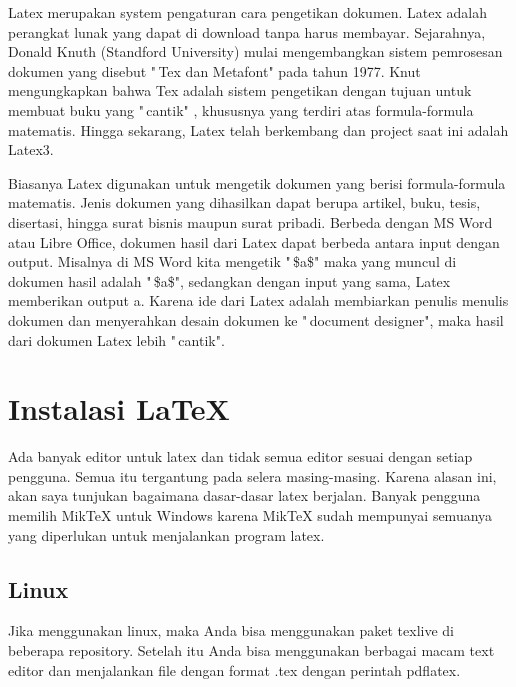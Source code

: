 \hspace{0,5in}Latex merupakan system pengaturan cara pengetikan dokumen. Latex adalah perangkat lunak yang dapat di download tanpa harus membayar. Sejarahnya, Donald Knuth (Standford University) mulai mengembangkan sistem pemrosesan dokumen yang disebut "\,Tex dan Metafont" pada tahun 1977. Knut mengungkapkan bahwa Tex adalah sistem pengetikan dengan tujuan 
untuk membuat buku yang "\,cantik" , khususnya yang terdiri atas formula-formula matematis. Hingga sekarang, Latex telah berkembang dan project saat ini adalah Latex3.\par \vspace{12pt}

\hspace{0,3in}Biasanya Latex digunakan untuk mengetik dokumen yang berisi formula-formula matematis. Jenis dokumen yang dihasilkan dapat berupa artikel, buku, tesis, disertasi, hingga surat bisnis maupun surat pribadi. Berbeda dengan MS Word atau Libre Office, dokumen hasil dari Latex dapat berbeda antara input dengan output. Misalnya di MS Word kita mengetik "\,\$a\$" maka yang muncul di dokumen hasil adalah "\,\$a\$", sedangkan dengan input yang sama, Latex memberikan output a. Karena ide dari Latex adalah membiarkan penulis menulis dokumen dan menyerahkan desain dokumen ke "\,document designer", maka hasil dari dokumen Latex lebih "\,cantik".\par \vspace{12pt}

\section{Instalasi LaTeX}\par \vspace{8pt}

Ada banyak editor untuk latex dan tidak semua editor sesuai dengan setiap pengguna. Semua itu tergantung pada selera masing-masing. Karena alasan ini, akan saya tunjukan bagaimana dasar-dasar latex berjalan. Banyak pengguna memilih MikTeX untuk Windows karena MikTeX sudah mempunyai semuanya yang diperlukan untuk menjalankan program latex. 
\par \vspace{12pt}
\subsection{Linux}
\par \vspace{8pt}
Jika menggunakan linux, maka Anda bisa menggunakan paket texlive di beberapa repository. Setelah itu Anda bisa menggunakan berbagai macam text editor dan menjalankan file dengan format .tex dengan perintah pdflatex.
\par \vspace{12pt}
